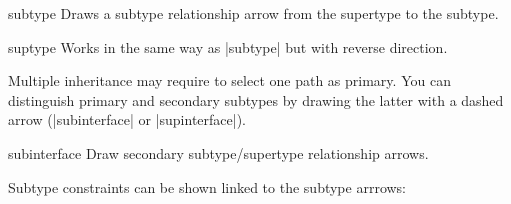 \documentclass[a4paper,10pt]{article}
\begin{document}
\begin{stylekey}{subtype}
Draws a subtype relationship arrow from the supertype to the subtype.
\begin{figure}[h]
\centering
\begin{codeexample}[]
\end{codeexample}
\end{figure}
\end{stylekey}

\begin{stylekey}{suptype}
Works in the same way as |subtype| but with reverse direction.
\begin{codeexample}[]
\end{codeexample}
\end{stylekey}

\noindent Multiple inheritance may require to select one path as primary.
You can distinguish primary and secondary subtypes by drawing the latter
with a dashed arrow (|subinterface| or |supinterface|).

\begin{stylekey}{subinterface}
Draw secondary subtype/supertype relationship arrows. 
\begin{codeexample}[]
\end{codeexample}
\end{stylekey}


\noindent
Subtype constraints can be shown linked to the subtype arrrows:

\begin{figure}[h]
\centering
\begin{codeexample}[]
\end{codeexample}
\end{figure}
\end{document}
